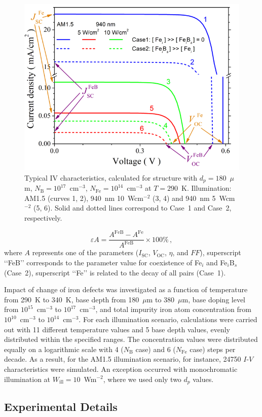 \documentclass[a4paper,fleqn]{cas-sc}
\begin{document}
\begin{figure}
	\centering
		\includegraphics[width=0.5\linewidth]{Figure2.png}
	  \caption{Typical IV characteristics,
   calculated for structure with $d_p = 180$~$\mu$m, $N_\mathrm{B}=10^{17}$~cm$^{-3}$,
   $N_\mathrm{Fe}=10^{14}$~cm$^{-3}$ at $T = 290$~K.
   Illumination: AM1.5 (curves 1, 2), 940~nm 10~Wcm$^{-2}$ (3, 4) and 940~nm 5~Wcm$^{-2}$ (5, 6).
   Solid and dotted lines correspond to Case~1 and Case~2, respectively.}\label{fig2}
\end{figure}


\begin{equation}
    \varepsilon A = \frac{A^\mathrm{FeB} - A^\mathrm{Fe}}{A^\mathrm{FeB}} \times 100 \%\,,
\end{equation}
where $A$ represents one of the parameters ($I_\mathrm{SC}$, $V_\mathrm{OC}$, $\eta$, and $FF$),
superscript ‘‘FeB’’ corresponds to the parameter value for coexistence of Fe$_i$ and Fe$_i$B$_s$ (Case~2),
superscript ‘‘Fe’’ is related to the decay of all pairs (Case~1).


Impact of change of iron defects was investigated as a function of temperature from 290~K to 340~K,
base depth from 180~$\mu$m to 380~$\mu$m,
base doping level from $10^{15}$~cm$^{-3}$ to $10^{17}$~cm$^{-3}$,
and total impurity iron atom concentration from $10^{10}$~cm$^{-3}$ to $10^{14}$~cm$^{-3}$.
For each illumination scenario, calculations were carried out with 11 different temperature values and 5 base depth values,
evenly distributed within the specified ranges.
The concentration values were distributed equally on a logarithmic scale with 4 ($N_\mathrm{B}$ case) and 6 ($N_\mathrm{Fe}$ case) steps per decade.
As a result, for the AM1.5 illumination scenario, for instance, 24750 $I$-$V$ characteristics were simulated.
An exception occurred with monochromatic illumination at $W_\mathrm{ill} = 10$~Wm$^{-2}$,
where we used only two $d_p$ values.

\subsection{Experimental Details}
\end{document}
